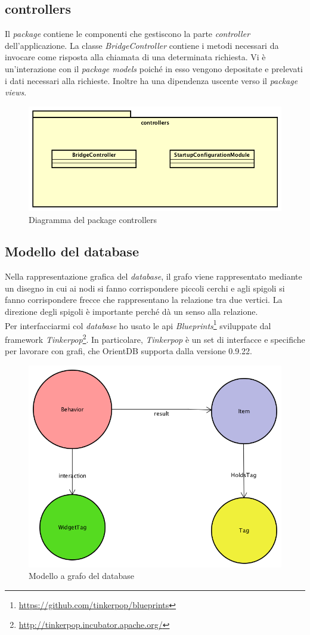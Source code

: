 \newpage
\subsection*{controllers}
Il \textit{package} contiene le componenti che gestiscono la parte \textit{controller} dell'applicazione. La classe \textit{BridgeController} contiene i metodi necessari da invocare come risposta alla chiamata di una determinata richiesta. Vi è un'interazione con il \textit{package models} poiché in esso vengono depositate e prelevati i dati necessari alla richieste. Inoltre ha una dipendenza uscente verso il \textit{package views}.
\begin{figure}[h]
\centering
\includegraphics[width=0.7\linewidth]{immagini/tres-controller}
\caption[Diagramma del package controllers]{Diagramma del package controllers}
\label{fig:tres-controller}
\end{figure}

\subsection{Modello del database}
Nella rappresentazione grafica del \textit{database}, il grafo viene rappresentato mediante
un disegno in cui ai nodi si fanno corrispondere piccoli cerchi e agli spigoli si fanno corrispondere frecce che rappresentano la relazione tra due vertici. La direzione degli spigoli è importante perché dà un senso alla relazione.\\
Per interfacciarmi col \textit{database} ho usato le \gls{api} \textit{Blueprints}\footnote{\url{https://github.com/tinkerpop/blueprints}} sviluppate dal \gls{framework} \textit{Tinkerpop}\footnote{\url{http://tinkerpop.incubator.apache.org/}}. In particolare, \textit{Tinkerpop} è un set di interfacce e specifiche per lavorare con grafi, che OrientDB supporta dalla versione 0.9.22.
\begin{figure}[h]
\centering
\includegraphics[width=0.6\linewidth]{immagini/db-a-graffo}
\caption[Modello a grafo del database]{Modello a grafo del database}
\label{fig:db-a-graffo}
\end{figure}

